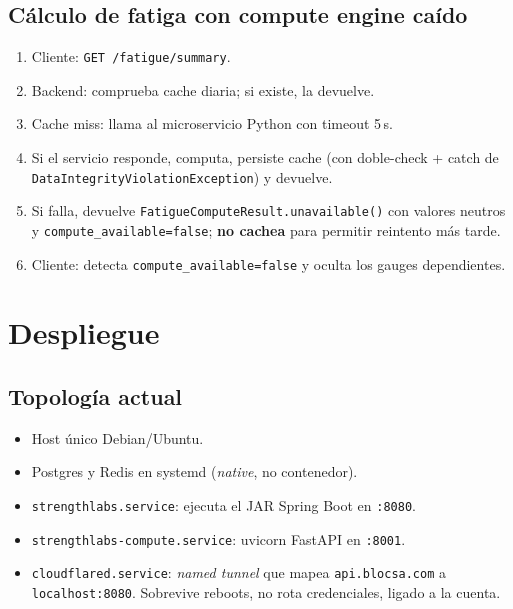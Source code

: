 \documentclass[11pt,a4paper]{article}
\begin{document}
\subsection{Cálculo de fatiga con compute engine caído}

\begin{enumerate}[leftmargin=*]
  \item Cliente: \texttt{GET /fatigue/summary}.
  \item Backend: comprueba cache diaria; si existe, la devuelve.
  \item Cache miss: llama al microservicio Python con timeout 5\,s.
  \item Si el servicio responde, computa, persiste cache (con doble-check + catch de \texttt{DataIntegrityViolationException}) y devuelve.
  \item Si falla, devuelve \texttt{FatigueComputeResult.unavailable()} con valores neutros y \texttt{compute\_available=false}; \textbf{no cachea} para permitir reintento más tarde.
  \item Cliente: detecta \texttt{compute\_available=false} y oculta los gauges dependientes.
\end{enumerate}

\section{Despliegue}

\subsection{Topología actual}

\begin{itemize}[leftmargin=*]
  \item Host único Debian/Ubuntu.
  \item Postgres y Redis en systemd (\textit{native}, no contenedor).
  \item \texttt{strengthlabs.service}: ejecuta el JAR Spring Boot en \texttt{:8080}.
  \item \texttt{strengthlabs-compute.service}: uvicorn FastAPI en \texttt{:8001}.
  \item \texttt{cloudflared.service}: \textit{named tunnel} que mapea \texttt{api.blocsa.com} a \texttt{localhost:8080}. Sobrevive reboots, no rota credenciales, ligado a la cuenta.
\end{itemize}
\end{document}
